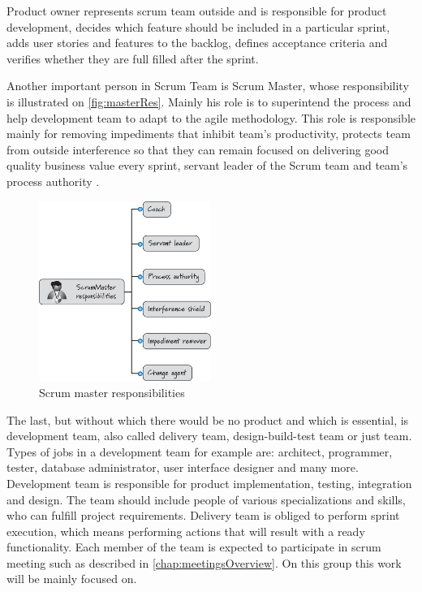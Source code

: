 Product owner represents scrum team outside and is responsible for product development, decides which feature should be included in a particular sprint, adds user stories and features to the backlog, defines acceptance criteria and verifies whether they are full filled after the sprint. 

Another important person in Scrum Team is Scrum Master, whose responsibility is illustrated on \autoref{fig:masterRes}. Mainly his role is to superintend the process and help development team to adapt to the agile methodology. This role is responsible mainly for removing impediments that inhibit team's productivity, protects team from outside interference so that they can remain focused on delivering good quality business value every sprint, servant leader of the Scrum team and team's process authority \cite{ScrumBook}.

\begin{figure}[h]
\caption{Scrum master responsibilities \cite{ScrumBook}}
\label{fig:masterRes}
\centering
\includegraphics[width=0.5\textwidth]{img/masterRes}
\end{figure}

The last, but without which there would be no product and which is essential, is development team, also called delivery team, design-build-test team or just team. Types of jobs in a development team for example are: architect, programmer, tester, database administrator, user interface designer and many more. Development team is responsible for product implementation, testing, integration and design. The team should include people of various specializations and skills, who can fulfill project requirements. Delivery team is obliged to perform sprint execution, which means performing actions that will result with a ready functionality. Each member of the team is expected to participate in scrum meeting such as described in \autoref{chap:meetingsOverview}. On this group this work will be mainly focused on.

